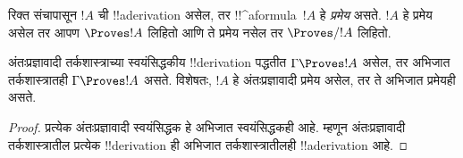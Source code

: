 \documentclass[../../../include/open-logic-section]{subfiles}
\begin{document}
\begin{defn}[प्रमेये]
रिक्त संचापासून $!A$ ची !!a{derivation} असेल,
तर !!^a{formula}~$!A$ हे \emph{प्रमेय} असते.
$!A$ हे प्रमेय असेल तर आपण $\Proves !A$ लिहितो
आणि ते प्रमेय नसेल तर $\Proves/ !A$ लिहितो.
\end{defn}

\begin{prop}
  अंतःप्रज्ञावादी तर्कशास्त्राच्या स्वयंसिद्धकीय
  !!{derivation} पद्धतीत $\Gamma \Proves !A$
  असेल, तर अभिजात तर्कशास्त्रातही
  $\Gamma \Proves !A$ असते. विशेषतः, $!A$ हे
  अंतःप्रज्ञावादी प्रमेय असेल, तर ते अभिजात प्रमेयही असते.
\end{prop}

\begin{proof}
  प्रत्येक अंतःप्रज्ञावादी स्वयंसिद्धक हे अभिजात
  स्वयंसिद्धकही आहे. म्हणून अंतःप्रज्ञावादी
  तर्कशास्त्रातील प्रत्येक !!{derivation} ही अभिजात
  तर्कशास्त्रातीलही !!a{derivation} आहे.
\end{proof}
\end{document}
